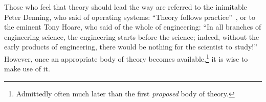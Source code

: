 Those who feel that theory should lead the way are referred to the
inimitable Peter Denning, who said of operating systems:
``Theory follows practice''~\cite{Denning:2015:POF:2830903.2830904},
or to the eminent Tony Hoare, who said of the whole of engineering:
``In all branches of engineering science, the engineering starts before
the science; indeed, without the early products of engineering, there
would be nothing for the scientist to
study!''~\cite{RichardMorris2007TonyHoareInterview}
However, once an appropriate body of theory becomes available,\footnote{
	Admittedly often much later than the first \emph{proposed}
	body of theory.}
it is wise to make use of it.



